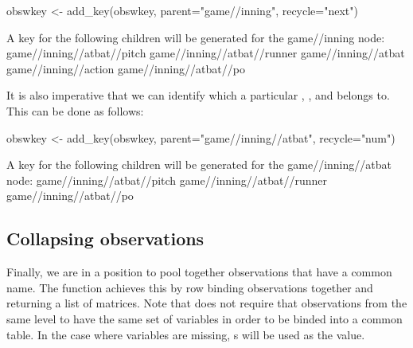\begin{article}
\begin{Schunk}
\begin{Sinput}
obswkey <- add_key(obswkey, parent="game//inning", recycle="next")
\end{Sinput}
\begin{Soutput}
A key for the following children will be generated for the game//inning node:
game//inning//atbat//pitch
game//inning//atbat//runner
game//inning//atbat
game//inning//action
game//inning//atbat//po
\end{Soutput}
\end{Schunk}


It is also imperative that we can identify which  a particular
, , and  belongs to. This can
be done as follows:

\begin{Schunk}
\begin{Sinput}
obswkey <- add_key(obswkey, parent="game//inning//atbat", recycle="num")
\end{Sinput}
\begin{Soutput}
A key for the following children will be generated for the game//inning//atbat node:
game//inning//atbat//pitch
game//inning//atbat//runner
game//inning//atbat//po
\end{Soutput}
\end{Schunk}



\subsection{Collapsing observations}

Finally, we are in a position to pool together observations that have
a common name. The  function achieves this by
row binding observations together and returning a list of matrices.
Note that  does not require that observations
from the same level to have the same set of variables in order to
be binded into a common table. In the case where variables are missing,
s will be used as the value.


\end{article}
